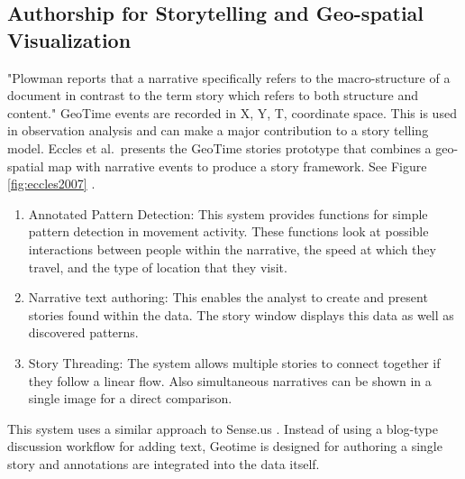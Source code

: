 \documentclass{egpubl}
\begin{document}
\subsection{Authorship for Storytelling and Geo-spatial Visualization}
%
"Plowman \cite{plowman1999} reports that a narrative specifically refers to the macro-structure of a document in contrast to the term story which refers to both structure and content."
GeoTime events are recorded in X, Y, T, coordinate space. This is used in observation analysis and can make a major contribution to a story telling model. Eccles et al.\ presents the GeoTime stories prototype that combines a geo-spatial map with narrative events to produce a story framework. See Figure \ref{fig:eccles2007} \cite{eccles2007}.
\begin{enumerate}
\item Annotated Pattern Detection: This system provides functions for simple pattern detection in movement activity. These functions look at possible interactions between people within the narrative, the speed at which they travel, and the type of location that they visit.
\item Narrative text authoring: This enables the analyst to create and present stories found within the data. The story window displays this data as well as discovered patterns. 
\item Story Threading: The system allows multiple stories to connect together if they follow a linear flow. Also simultaneous narratives can be shown in a single image for a direct comparison.
\end{enumerate}
 This system uses a similar approach to Sense.us \cite{heer2007}. Instead of using a blog-type discussion workflow for adding text, Geotime is designed for authoring a single story and annotations are integrated into the data itself.
\end{document}
